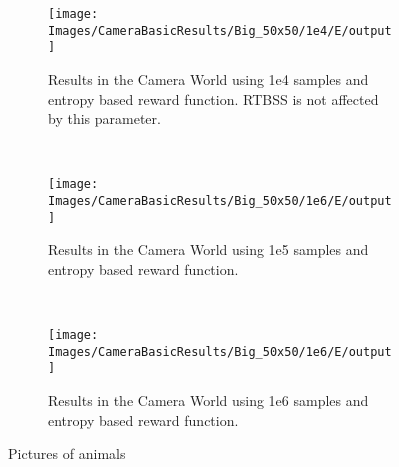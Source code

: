\begin{figure}[h]
        \centering
        \begin{subfigure}[t]{0.3\textwidth}
                \texttt{[image: Images/CameraBasicResults/Big\_50x50/1e4/E/output]}
                \caption{Results in the Camera World using 1e4 samples and entropy based reward
                function. RTBSS is not affected by this parameter.}
                \label{fig:m4e}
        \end{subfigure}%
        ~ %
        \begin{subfigure}[t]{0.3\textwidth}
                \texttt{[image: Images/CameraBasicResults/Big\_50x50/1e6/E/output]}
                \caption{Results in the Camera World using 1e5 samples and entropy based reward
                function.}
                \label{fig:m5e}
        \end{subfigure}
        ~ %
        \begin{subfigure}[t]{0.3\textwidth}
                \texttt{[image: Images/CameraBasicResults/Big\_50x50/1e6/E/output]}
                \caption{Results in the Camera World using 1e6 samples and entropy based reward
                function.}
                \label{fig:m6e}
        \end{subfigure}
        \caption{Pictures of animals}\label{fig:me}
\end{figure}

